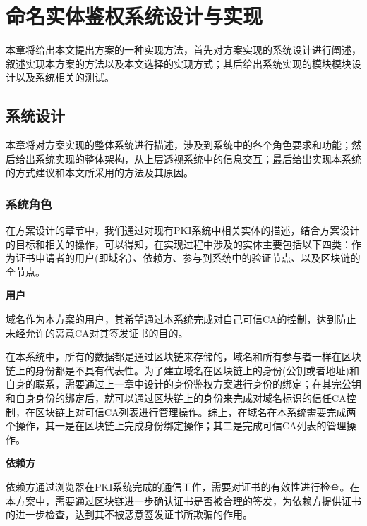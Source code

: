 
\chapter{命名实体鉴权系统设计与实现}

本章将给出本文提出方案的一种实现方法，首先对方案实现的系统设计进行阐述，叙述实现本方案的方法以及本文选择的实现方式；其后给出系统实现的模块模块设计以及系统相关的测试。

\section{系统设计}

本章将对方案实现的整体系统进行描述，涉及到系统中的各个角色要求和功能；然后给出系统实现的整体架构，从上层透视系统中的信息交互；最后给出实现本系统的方式建议和本文所采用的方法及其原因。

\subsection{系统角色}


在方案设计的章节中，我们通过对现有PKI系统中相关实体的描述，结合方案设计的目标和相关的操作，可以得知，在实现过程中涉及的实体主要包括以下四类：作为证书申请者的用户(即域名）、依赖方、参与到系统中的验证节点、以及区块链的全节点。


\noindent\textbf{用户}

域名作为本方案的用户，其希望通过本系统完成对自己可信CA的控制，达到防止未经允许的恶意CA对其签发证书的目的。

在本系统中，所有的数据都是通过区块链来存储的，域名和所有参与者一样在区块链上的身份都是不具有代表性。为了建立域名在区块链上的身份(公钥或者地址)和自身的联系，需要通过上一章中设计的身份鉴权方案进行身份的绑定；在其完公钥和自身身份的绑定后，就可以通过区块链上的身份来完成对域名标识的信任CA控制，在区块链上对可信CA列表进行管理操作。综上，在域名在本系统需要完成两个操作，其一是在区块链上完成身份绑定操作；其二是完成可信CA列表的管理操作。


\noindent\textbf{依赖方}

依赖方通过浏览器在PKI系统完成的通信工作，需要对证书的有效性进行检查。在本方案中，需要通过区块链进一步确认证书是否被合理的签发，为依赖方提供证书的进一步检查，达到其不被恶意签发证书所欺骗的作用。

